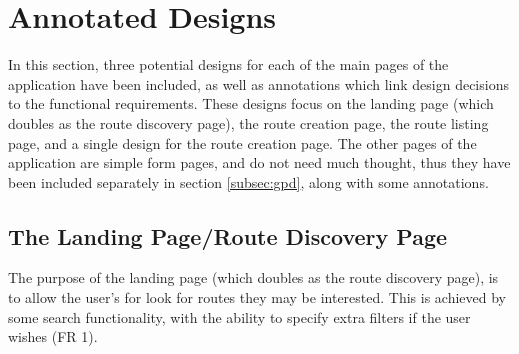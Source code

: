 \documentclass[a4paper,twoside,notitlepage,11pt]{article}
\begin{document}
 
\newpage 
\section{Annotated Designs}
In this section, three potential designs for each of the main pages of the application have been included, as well as annotations which link design decisions to the functional requirements. These designs focus on the landing page (which doubles as the route discovery page), the route creation page, the route listing page, and a single design for the route creation page. The other pages of the application are simple form pages, and do not need much thought, thus they have been included separately in section \ref{subsec:gpd}, along with some annotations. 

\subsection{The Landing Page/Route Discovery Page}
The purpose of the landing page (which doubles as the route discovery page), is to allow the user's for look for routes they may be interested. This is achieved by some search functionality, with the ability to specify extra filters if the user wishes (FR 1).
\end{document}
